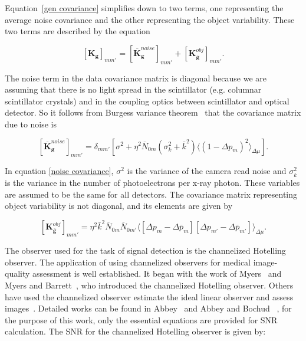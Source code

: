 \noindent
Equation~\ref{gen covariance} simplifies down to two terms, one representing the average noise covariance and the other representing the object variability.  These two terms are described by the equation

\begin{equation}
\label{gen covariance2}
[\mathbf{K_g}]_{mm'} = [\overline{\mathbf{K}}_\mathbf{g}^{noise}]_{mm'}+[\mathbf{K}_{\mathbf{\bar{g}}}^{obj}]_{mm'}.
\end{equation}

\noindent
The noise term in the data covariance matrix is diagonal because we are assuming that there is no light spread in the scintillator (e.g. columnar scintillator crystals) and in the coupling optics between scintillator and optical detector.  So it follows from Burgess variance theorem~\citep{Barrett2004} that the covariance matrix due to noise is 

\begin{equation}
\label{noise covariance}
[\overline{\mathbf{K}}_\mathbf{g}^{noise}]_{mm'}= \delta_{mm'}[\sigma^2 + \eta^2 \overline{N}_{0m} (\sigma_k^2 + \bar{k}^2)\langle(1-\Delta p_m)^2 \rangle_{\Delta\mu}].
\end{equation}

\noindent
In equation \ref{noise covariance}, $\sigma^2$ is the variance of the camera read noise and $\sigma_k^2$ is the variance in the number of photoelectrons per x-ray photon.  These variables are assumed to be the same for all detectors.
The covariance matrix representing object variability is not diagonal, and its elements are given by

\begin{equation}
\label{object covariance}
[\mathbf{K}_{\mathbf{\bar{g}}}^{obj}]_{mm'}=\eta^2\bar{k}^2\overline{N}_{0m}\overline{N}_{0m'} \langle[\Delta p_m - \Delta \bar{p}_m][\Delta p_{m'}-\Delta \bar{p}_{m'}]\rangle _{\Delta \mu}.
\end{equation}

\noindent
The observer used for the task of signal detection is the channelized Hotelling observer.  The application of using channelized observers for medical image-quality assessment is well established.  It began with the work of Myers~\citep{MyersThesis} and Myers and Barrett~\citep{Myers1987}, who introduced the channelized Hotelling observer.  Others have used the channelized observer estimate the ideal linear observer and assess images~\citep{Gallas2003,Abbey2000, Abbey2001}.  Detailed works can be found in Abbey~\citep{AbbeyThesis} and Abbey and Bochud~\citep{Abbey2000} , for the purpose of this work, only the essential equations are provided for SNR calculation.
The SNR for the channelized Hotelling observer is given by:

